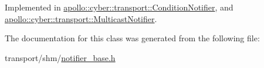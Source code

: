 Implemented in \hyperlink{classapollo_1_1cyber_1_1transport_1_1ConditionNotifier_a057d3f71a69a9913107416166a01a81b}{apollo\-::cyber\-::transport\-::\-Condition\-Notifier}, and \hyperlink{classapollo_1_1cyber_1_1transport_1_1MulticastNotifier_ad93fdda54a6d3064dc613ea558f3be2b}{apollo\-::cyber\-::transport\-::\-Multicast\-Notifier}.



The documentation for this class was generated from the following file\-:\begin{DoxyCompactItemize}
\item 
transport/shm/\hyperlink{notifier__base_8h}{notifier\-\_\-base.\-h}\end{DoxyCompactItemize}
